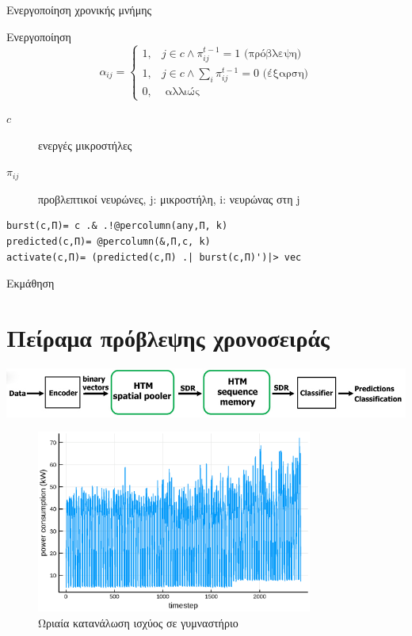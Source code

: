 \documentclass[10pt,lualatex]{beamer}
\begin{document}
\begin{frame}[fragile]{Ενεργοποίηση χρονικής μνήμης}
\begin{block}{Ενεργοποίηση}
  \begin{equation}
    α_{ij}= \begin{cases} 1, &j \in c \wedge π_{ij}^{t-1}=1 \text{ (πρόβλεψη)}\\
                          1, &j \in c \wedge \sum_i π_{ij}^{t-1}=0 \text{ (έξαρση)}\\
                          0, &\text{ αλλιώς}
            \end{cases}
  \end{equation}
  \begin{description}
    \item[$c$] ενεργές μικροστήλες
    \item[$π_{ij}$] προβλεπτικοί νευρώνες, j: μικροστήλη, i: νευρώνας στη j
  \end{description}
\end{block}
\begin{verbatim}
burst(c,Π)= c .& .!@percolumn(any,Π, k)
predicted(c,Π)= @percolumn(&,Π,c, k)
activate(c,Π)= (predicted(c,Π) .| burst(c,Π)')|> vec
\end{verbatim}
\end{frame}

\begin{frame}{Εκμάθηση}
\end{frame}

\section{Πείραμα πρόβλεψης χρονοσειράς}

\begin{frame}
  \centering
  \includegraphics[width=\textwidth]{../figures/htm_predict_pipeline}
  \pause
  \begin{figure}
    \includegraphics[width=\textwidth,height=6cm]{../figures/tshotgym}
    \caption{Ωριαία κατανάλωση ισχύος σε γυμναστήριο}
  \end{figure}
\end{frame}
\end{document}
